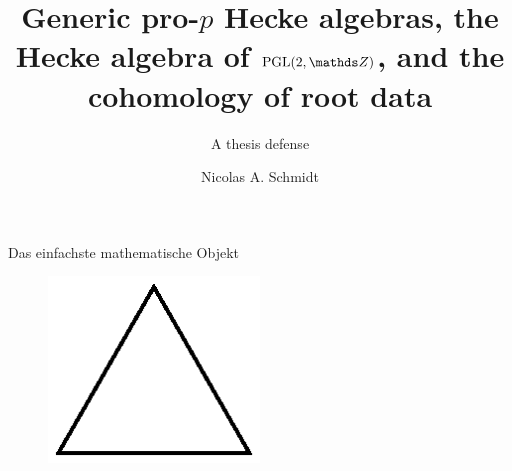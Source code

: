 \documentclass[pdf]{beamer}
\title{Generic pro-$p$ Hecke algebras, the Hecke algebra of $\op{PGL}(2,\Z)$, and the cohomology of root data}
\subtitle{A thesis defense}
\author{Nicolas A. Schmidt}
\begin{document}
\begin{frame}
   \titlepage
\end{frame}

\begin{frame}{Das einfachste mathematische Objekt}
   \pause
   \begin{figure}
   \centering
      \includegraphics[width=0.5\textwidth]{graphics/triangle.eps}
   \end{figure}
\end{frame}
\end{document}
